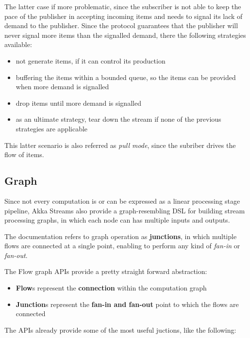 The latter case if more problematic, since the subscriber is not able to
keep the pace of the publisher in accepting incoming items and needs to
signal its lack of demand to the publisher. Since the protocol
guarantees that the publisher will never signal more items than the
signalled demand, there the following strategies available:

\begin{itemize}
\itemsep1pt\parskip0pt
\item
  not generate items, if it can control its production
\item
  buffering the items within a bounded queue, so the items can be
  provided when more demand is signalled
\item
  drop items until more demand is signalled
\item
  as an ultimate strategy, tear down the stream if none of the previous
  strategies are applicable
\end{itemize}

This latter scenario is also referred as \emph{pull mode}, since the
subriber drives the flow of items.

\subsection{Graph}\label{graph}

Since not every computation is or can be expressed as a linear
processing stage pipeline, Akka Streams also provide a graph-resembling
DSL for building stream processing graphs, in which each node can has
multiple inputs and outputs.

The documentation refers to graph operation as \textbf{junctions}, in
which multiple flows are connected at a single point, enabling to
perform any kind of \emph{fan-in} or \emph{fan-out}.

The Flow graph APIs provide a pretty straight forward abstraction:

\begin{itemize}
\itemsep1pt\parskip0pt
\item
  \textbf{Flow}s represent the \textbf{connection} within the
  computation graph
\item
  \textbf{Junction}s represent the \textbf{fan-in and fan-out} point to
  which the flows are connected
\end{itemize}

The APIs already provide some of the most useful juctions, like the
following:

